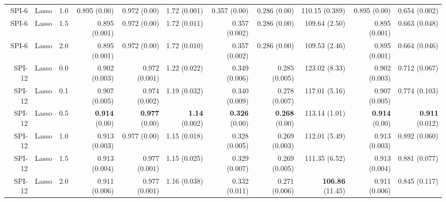 \begin{table}
\begin{tabular}{rrrrrrrrrrr}
  SPI-6 &     Lasso &   1.0 &         0.895 (0.00) &        0.972 (0.00) &        1.72 (0.001) &         0.357 (0.00) &         0.286 (0.00) &        110.15 (0.389) &         0.895 (0.00) &        0.654 (0.002) \\
  SPI-6 &     Lasso &   1.5 &        0.895 (0.001) &        0.972 (0.00) &        1.72 (0.011) &        0.357 (0.002) &         0.286 (0.00) &         109.64 (2.50) &        0.895 (0.001) &        0.663 (0.048) \\
  SPI-6 &     Lasso &   2.0 &        0.895 (0.001) &        0.972 (0.00) &        1.72 (0.010) &        0.357 (0.002) &         0.286 (0.00) &         109.53 (2.46) &        0.895 (0.001) &        0.664 (0.046) \\
 SPI-12 &     Lasso &   0.0 &        0.902 (0.003) &       0.972 (0.001) &        1.22 (0.022) &        0.349 (0.006) &        0.285 (0.005) &         123.02 (8.33) &        0.902 (0.003) &        0.712 (0.067) \\
 SPI-12 &     Lasso &   0.1 &        0.907 (0.005) &       0.974 (0.002) &        1.19 (0.032) &        0.340 (0.009) &        0.278 (0.007) &         117.01 (5.16) &        0.907 (0.005) &        0.774 (0.103) \\
 SPI-12 &     Lasso &   0.5 &  { \bf 0.914} (0.00) & { \bf 0.977} (0.00) & { \bf 1.14} (0.002) &  { \bf 0.326} (0.00) &  { \bf 0.268} (0.00) &         113.14 (1.01) &  { \bf 0.914} (0.00) & { \bf 0.911} (0.012) \\
 SPI-12 &     Lasso &   1.0 &        0.913 (0.003) &        0.977 (0.00) &        1.15 (0.018) &        0.328 (0.005) &        0.269 (0.003) &         112.01 (5.49) &        0.913 (0.003) &        0.892 (0.060) \\
 SPI-12 &     Lasso &   1.5 &        0.913 (0.004) &       0.977 (0.001) &        1.15 (0.025) &        0.329 (0.007) &        0.269 (0.005) &         111.35 (6.52) &        0.913 (0.004) &        0.881 (0.077) \\
 SPI-12 &     Lasso &   2.0 &        0.911 (0.006) &       0.977 (0.001) &        1.16 (0.038) &        0.332 (0.011) &        0.271 (0.006) & { \bf 106.86} (11.45) &        0.911 (0.006) &        0.845 (0.117) \\
\bottomrule
\end{tabular}
\end{table}
